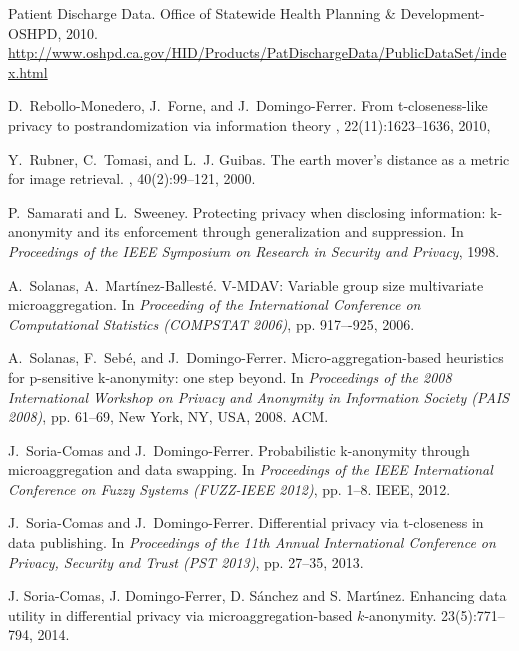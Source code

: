 \documentclass[10pt,journal,compsoc]{IEEEtran}
\theoremstyle{definition}
\theoremstyle{plain}
\begin{document}
\begin{thebibliography}{10}
	Patient Discharge Data. 
	\newblock Office of Statewide Health Planning \& Development-OSHPD, 2010. 
\newblock \url{http://www.oshpd.ca.gov/HID/Products/PatDischargeData/PublicDataSet/index.html}
	
	D.~Rebollo-Monedero, J.~Forne, and J.~Domingo-Ferrer.
	\newblock From t-closeness-like privacy to postrandomization via information theory
	, 22(11):1623--1636, 2010, 
	
	Y.~Rubner, C.~Tomasi, and L.~J. Guibas.
	\newblock The earth mover's distance as a metric for image retrieval.
	, 40(2):99--121, 2000.
	
	P.~Samarati and L.~Sweeney.
	\newblock Protecting privacy when disclosing information: k-anonymity and its
	enforcement through generalization and suppression.
	\newblock In {\em Proceedings of the IEEE Symposium on Research in Security and
		Privacy}, 1998.
	
	A.~Solanas, A.~Mart{\'i}nez-Ballest{\'e}.
	\newblock V-MDAV: Variable group size multivariate microaggregation.
	\newblock In {\em Proceeding of the International Conference on Computational 
		Statistics (COMPSTAT 2006)}, pp. 917–-925, 2006.
	
	A.~Solanas, F.~Seb{\'e}, and J.~Domingo-Ferrer.
	\newblock Micro-aggregation-based heuristics for p-sensitive k-anonymity: one
	step beyond.
	\newblock In {\em Proceedings of the 2008 International Workshop on Privacy and
		Anonymity in Information Society (PAIS 2008)}, pp. 61--69, New York, NY, USA,
	2008. ACM.
	
	J.~Soria-Comas and J.~Domingo-Ferrer.
	\newblock Probabilistic k-anonymity through microaggregation and data swapping.
	\newblock In {\em Proceedings of the IEEE International Conference on Fuzzy
		Systems (FUZZ-IEEE 2012)}, pp. 1--8. IEEE, 2012.
	
	J.~Soria-Comas and J.~Domingo-Ferrer.
	\newblock Differential privacy via t-closeness in data publishing.
	\newblock In {\em Proceedings of the 11th Annual International Conference on
		Privacy, Security and Trust (PST 2013)}, pp. 27--35, 2013.
	
 J. Soria-Comas, J. Domingo-Ferrer,
D. S\'anchez and S. Mart\'{\i}nez.
\newblock Enhancing data utility in differential privacy via 
microaggregation-based $k$-anonymity.
 23(5):771--794, 2014. 


\end{thebibliography}
\end{document}
